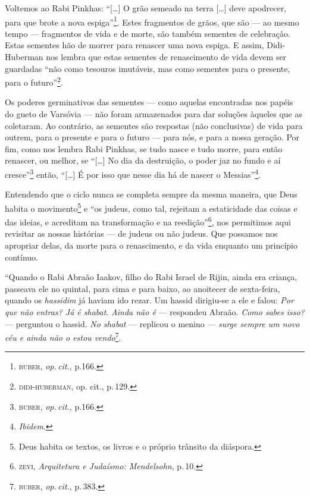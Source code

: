 \begin{center}\end{center}

Voltemos ao Rabi Pinkhas: ``{[}\ldots{}{]} O grão semeado na terra
{[}\ldots{}{]} deve apodrecer, para que brote a nova espiga''\footnote{\textsc{buber},
  \emph{op.\,cit.}, p.166.}. Estes fragmentos de grãos, que são --- ao mesmo
tempo --- fragmentos de vida e de morte, são também sementes de
celebração. Estas sementes hão de morrer para renascer uma nova espiga.
E assim, Didi-Huberman nos lembra que estas sementes de renascimento de
vida devem ser guardadas ``não como tesouros imutáveis, mas como
sementes para o presente, para o futuro''\footnote{\textsc{didi-huberman}, op.
  cit., p.\,129.}.

Os poderes germinativos das sementes --- como aquelas encontradas nos
papéis do gueto de Varsóvia --- não foram armazenados para dar soluções
àqueles que as coletaram. Ao contrário,
as sementes são respostas (não conclusivas) de vida para outrem, para o
presente e para o futuro --- para nós, e para a nossa geração. Por fim,
como nos lembra Rabi Pinkhas, se tudo nasce e tudo morre, para então
renascer, ou melhor, se ``{[}\ldots{}{]} No dia da destruição, o poder
jaz no fundo e aí cresce''\footnote{\textsc{buber}, \emph{op.\,cit.}, p.166.}
então, ``{[}\ldots{}{]} É por isso que nesse dia há de nascer o
Messias''\footnote{\emph{Ibidem}.}.

Entendendo que o ciclo nunca se completa sempre da mesma maneira, que
Deus habita o movimento\footnote{Deus habita os textos, os livros e o
  próprio trânsito da diáspora.} e ``os judeus, como tal, rejeitam
a estaticidade das coisas e das ideias, e acreditam na transformação e
na reedição''\footnote{\textsc{zevi}, \emph{Arquitetura e Judaísmo: Mendelsohn},
  p.\,10.}, nos permitimos aqui revisitar as nossas histórias --- de
judeus ou não judeus. Que possamos nos apropriar delas, da morte para o
renascimento, e da vida enquanto um princípio contínuo.

\begin{center}\end{center}

\noindent{}``Quando o Rabi Abraão Iaakov, filho do Rabi Israel de Rijin,
ainda era criança, passeava ele no quintal, para cima e para baixo, ao
anoitecer de sexta-feira, quando os \emph{hassidim} já haviam ido rezar. Um
hassid dirigiu-se a ele e falou: \emph{Por que não entras? Já é \emph{shabat}}.
\emph{Ainda não é} --- respondeu Abraão. \emph{Como sabes isso?} --- perguntou o
hassid. \emph{No \emph{shabat}} --- replicou o menino --- \emph{surge sempre um novo céu
e ainda não o estou vendo}\footnote{\textsc{buber}, \emph{op.\,cit.}, p.\,383.}.

